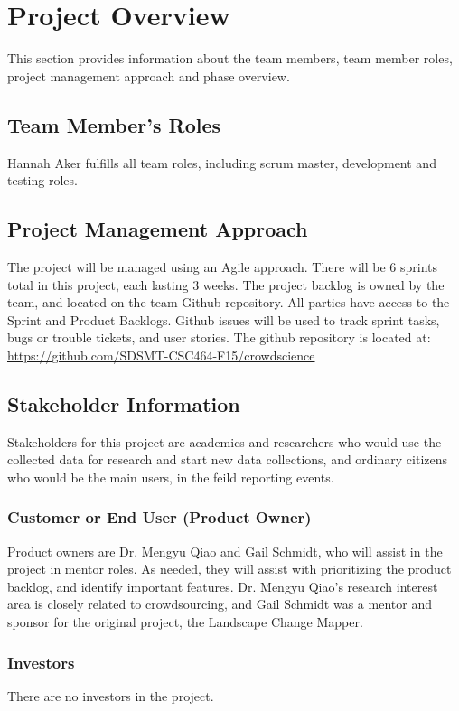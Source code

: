 

\chapter{Project Overview}
This section provides information about the team members, team member roles, project management approach and phase overview.

\section{Team Member's Roles}
Hannah Aker fulfills all team roles, including scrum master, development and testing roles.

\section{Project  Management Approach}
The project will be managed using an Agile approach.  There will be 6 sprints total in this project, each lasting 3 weeks. The project backlog is owned by the team, and located on the team Github repository. All parties have access to the Sprint and Product Backlogs. Github issues will be used to track sprint tasks, bugs or trouble tickets, and user stories. The github repository is located at: \url{https://github.com/SDSMT-CSC464-F15/crowdscience} 


\section{ Stakeholder Information}
Stakeholders for this project are academics and researchers who would use the collected data for research and start new data collections, and ordinary citizens who would be the main users, in the feild reporting events. 


\subsection{Customer or End User (Product Owner)}
Product owners are Dr. Mengyu Qiao and Gail Schmidt, who will assist in the project in mentor roles. As needed, they will assist with prioritizing the product backlog, and identify important features. Dr. Mengyu Qiao's research interest area is closely related to crowdsourcing, and Gail Schmidt was a mentor and sponsor for the original project, the Landscape Change Mapper.

\subsection{Investors}
There are no investors in the project.

